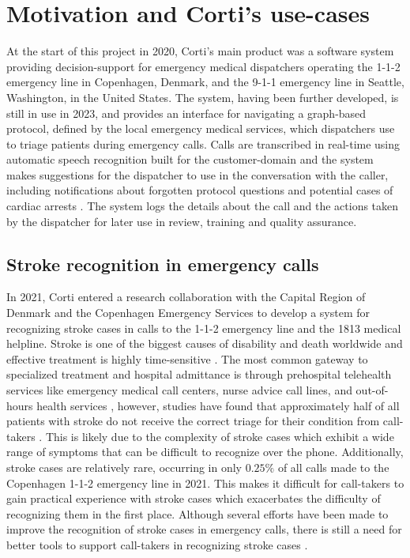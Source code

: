 \section{Motivation and Corti's use-cases}
%
%
At the start of this project in 2020, Corti's main product was a software system providing decision-support for emergency medical dispatchers operating the 1-1-2 emergency line in Copenhagen, Denmark, and the 9-1-1 emergency line in Seattle, Washington, in the United States.
The system, having been further developed, is still in use in 2023, and provides an interface for navigating a graph-based protocol, defined by the local emergency medical services, which dispatchers use to triage patients during emergency calls. 
Calls are transcribed in real-time using automatic speech recognition built for the customer-domain and the system makes suggestions for the dispatcher to use in the conversation with the caller, including notifications about forgotten protocol questions \cite{havtorn_multiqt_2020} and potential cases of cardiac arrests \cite{cite15, cite14}. The system logs the details about the call and the actions taken by the dispatcher for later use in review, training and quality assurance. 


\subsection{Stroke recognition in emergency calls}
%
In 2021, Corti entered a research collaboration with the Capital Region of Denmark and the Copenhagen Emergency Services to develop a system for recognizing stroke cases in calls to the 1-1-2 emergency line and the 1813 medical helpline. 
Stroke is one of the biggest causes of disability and death worldwide \cite{cite1,cite2,cite3} and effective treatment is highly time-sensitive \cite{cite4,cite5}. The most common gateway to specialized treatment and hospital admittance is through prehospital telehealth services like emergency medical call centers, nurse advice call lines, and out-of-hours health services \cite{cite6,cite7}, however, studies have found that approximately half of all patients with stroke do not receive the correct triage for their condition from call-takers \cite{cite10,cite11,cite12}. 
This is likely due to the complexity of stroke cases which exhibit a wide range of symptoms that can be difficult to recognize over the phone. Additionally, stroke cases are relatively rare, occurring in only $0.25\%$ of all calls made to the Copenhagen 1-1-2 emergency line in 2021. This makes it difficult for call-takers to gain practical experience with stroke cases which exacerbates the difficulty of recognizing them in the first place. Although several efforts have been made to improve the recognition of stroke cases in emergency calls, there is still a need for better tools to support call-takers in recognizing stroke cases \cite{cite13,cite14,cite15}.

